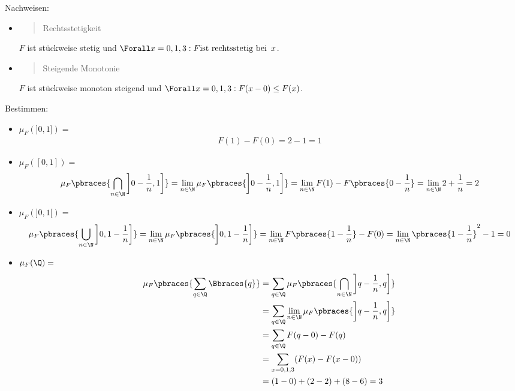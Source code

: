 \begin{solution}

Nachweisen:

\begin{itemize}

  \item \blockquote{Rechtsstetigkeit}: $F$ ist stückweise stetig und $\Forall x = 0, 1, 3: F \text{ist rechtsstetig bei} \enspace x$.

  \item \blockquote{Steigende Monotonie}: $F$ ist stückweise monoton steigend und $\Forall x = 0, 1, 3: F(x - 0) \leq F(x)$.

\end{itemize}

Bestimmen:

\begin{itemize}

  \item $\mu_F(]0, 1]) =$
  \begin{align*}
    F(1) - F(0) = 2 - 1 = 1
  \end{align*}

  \item $\mu_F([0, 1]) =$
  \begin{align*}
    \mu_F \pbraces{\bigcap_{n \in \N} \left ] 0 - \frac{1}{n}, 1 \right]}
    =
    \lim_{n \in \N} \mu_F \pbraces{ \left ] 0 - \frac{1}{n}, 1 \right]}
    =
    \lim_{n \in \N} F(1) - F \pbraces{0 - \frac{1}{n}}
    =
    \lim_{n \in \N} 2 + \frac{1}{n} = 2
  \end{align*}

  \item $\mu_F(]0, 1[) =$
  \begin{align*}
    \mu_F \pbraces{\bigcup_{n \in \N} \left ] 0, 1 - \frac{1}{n} \right ]}
    =
    \lim_{n \in \N} \mu_F \pbraces{\left ] 0, 1 - \frac{1}{n} \right ]}
    =
    \lim_{n \in \N} F \pbraces{1 - \frac{1}{n}} - F(0)
    =
    \lim_{n \in \N} \pbraces{1 - \frac{1}{n}}^2 - 1 = 0
  \end{align*}

  \item $\mu_F(\Q) =$
  \begin{align*}
    \mu_F \pbraces{\sum_{q \in \Q} \Bbraces{q}}
    & =
    \sum_{q \in \Q} \mu_F \pbraces
    {\bigcap_{n \in \N} \left ] q - \frac{1}{n}, q \right ]} \\
    & =
    \sum_{q \in \Q} \lim_{n \in \N} \mu_F \pbraces
    {\left ] q - \frac{1}{n}, q \right ]} \\
    & =
    \sum_{q \in \Q} F(q - 0) - F(q) \\
    & =
    \sum_{x = 0, 1, 3} (F(x) - F(x - 0)) \\
    & =
    (1 - 0) + (2 - 2) + (8 - 6) = 3
  \end{align*}

\end{itemize}

\end{solution}

